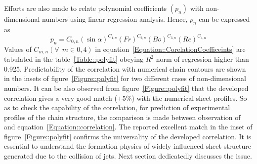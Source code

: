 \documentclass[%
 aip,
 sd,%
amsmath,amssymb,
preprint,%
author-year,%
]{revtex4-1}
\begin{document}
Efforts are also made to relate polynomial coefficients $\left(p_n\right)$ with non-dimensional numbers using linear regression analysis. Hence, $p_n$ can be expressed as
\begin{equation}\label{Equation::CorelationCoefficeints}
p_n = C_{0,n}\left(\sin\alpha\right)^{C_{1,n}}\left(Fr\right)^{C_{2,n}}\left(Bo\right)^{C_{3,n}}\left(Re\right)^{C_{4,n}}
\end{equation}
Values of $C_{m,n} \left(\forall\:\: m \in {0,4}\right)$ in equation~\ref{Equation::CorelationCoefficeints} are tabulated in the table~\ref{Table::polyfit} obeying $R^2$ norm of regression higher than 0.925. Predictability of the correlation with numerical chain contours are shown in the insets of figure~\ref{Figure::polyfit} for two different cases of non-dimensional numbers. It can be also observed from figure~\ref{Figure::polyfit} that the developed correlation gives a very good match ($\pm$5\%) with the numerical sheet profiles. So as to check the capability of the correlation, for prediction of experimental profiles of the chain structure, the comparison is made between observation of \cite{bush2004collision} and equation~\ref{Equation::correlation}. The reported excellent match in the inset of figure~\ref{Figure::polyfit} confirms the universality of the developed correlation. It is essential to understand the formation physics of widely influenced sheet structure generated due to the collision of jets. Next section dedicatedly discusses the issue.
\end{document}
